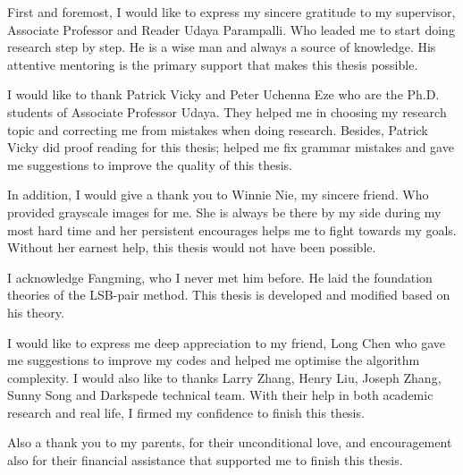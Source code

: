 
\begin{acknowledgements}      

First and foremost, I would like to express my sincere gratitude to my supervisor, Associate Professor and Reader Udaya Parampalli. Who leaded me to start doing research step by step. He is a wise man and always a source of knowledge. His attentive mentoring is the primary support that makes this thesis possible.

I would like to thank Patrick Vicky and Peter Uchenna Eze who are the Ph.D. students of Associate Professor Udaya. They helped me in choosing my research topic and correcting me from mistakes when doing research. Besides, Patrick Vicky did proof reading for this thesis; helped me fix grammar mistakes and gave me suggestions to improve the quality of this thesis.

In addition, I would give a thank you to Winnie Nie, my sincere friend. Who provided grayscale images for me. She is always be there by my side during my most hard time and her persistent encourages helps me to fight towards my goals. Without her earnest help, this thesis would not have been possible.

I acknowledge Fangming, who I never met him before. He laid the foundation theories of the LSB-pair method. This thesis is developed and modified based on his theory. 

I would like to express me deep appreciation to my friend, Long Chen who gave me suggestions to improve my codes and helped me optimise the algorithm complexity. I would also like to thanks Larry Zhang, Henry Liu, Joseph Zhang, Sunny Song and Darkspede technical team. With their help in both academic research and real life, I firmed my confidence to finish this thesis. 

Also a thank you to my parents, for their unconditional love, and encouragement also for their financial assistance that supported me to finish this thesis. 

\end{acknowledgements}
